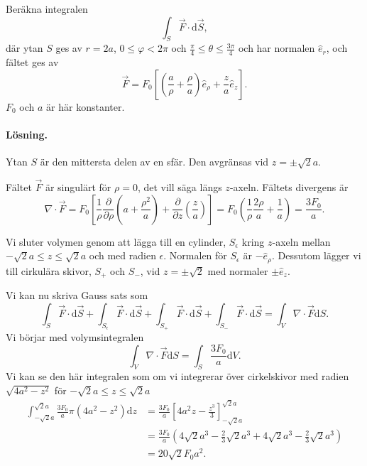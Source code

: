 \documentclass[%
oneside,                 %
final,                   %
10pt]{article}
\begin{document}
\vspace{3mm}


Beräkna integralen
\begin{equation}
  \int_S \vec{F} \cdot \mbox{d}\vec{S},
\end{equation}
där ytan $S$ ges av $r = 2a$, $0 \le \varphi < 2\pi$ och $\frac{\pi}{4} \le \theta \le \frac{3\pi}{4}$ och har normalen $\hat{e}_{r}$, och fältet ges av
\begin{equation}
  \vec{F} = F_0 \left[\left(\frac{a}{\rho} + \frac{\rho}{a}\right) 
\hat{e}_{\rho} + \frac{z}{a} \hat{e}_{z}\right].
\end{equation}
$F_0$ och $a$ är här konstanter.

\paragraph{Lösning.}
Ytan $S$ är den mittersta delen av en sfär. Den avgränsas vid $z = \pm \sqrt{2} a$.

Fältet $\vec{F}$ är singulärt för $\rho = 0$, det vill säga längs $z$-axeln.  Fältets divergens är
\begin{equation}
  \nabla \cdot \vec{F} = F_0 \left[\frac{1}{\rho} \frac{\partial}{\partial \rho}
\left(a+ \frac{\rho^2}{a}\right) + \frac{\partial}{\partial z} \left(\frac{z}{a}
\right)\right] = F_0 \left(\frac{1}{\rho}\frac{2\rho}{a} + \frac{1}{a}\right) =
\frac{3 F_0}{a}.
\end{equation}

Vi sluter volymen genom att lägga till en cylinder, $S_\epsilon$ kring $z$-axeln mellan $-\sqrt{2}a \le z \le \sqrt{2}a$ och med radien $\epsilon$.  Normalen för $S_\epsilon$ är $-\hat{e}_{\rho}$.  Dessutom lägger vi till cirkulära skivor, $S_+$ och $S_-$, vid $z = \pm \sqrt{2}$ med normaler $\pm \hat{e}_{z}$.

Vi kan nu skriva Gauss sats som
\begin{equation}
\int_S \vec{F} \cdot \mbox{d}\vec{S} + \int_{S_\epsilon} \vec{F} \cdot \mbox{d}\vec{S} +
\int_{S_+} \vec{F} \cdot \mbox{d}\vec{S} + \int_{S_-} \vec{F} \cdot \mbox{d}\vec{S} =
\int_V \nabla \cdot \vec{F} \mbox{d}S.
\end{equation}
Vi börjar med volymsintegralen
\begin{equation}
  \int_V \nabla \cdot \vec{F} \mbox{d}S = \int_S \frac{3 F_0}{a} \mbox{d}V.
\end{equation}
Vi kan se den här integralen som om vi integrerar över cirkelskivor med radien $\sqrt{4 a^2 -z^2}$ för $-\sqrt{2}a \le z \le \sqrt{2}a$
\begin{align}
  \int_{-\sqrt{2}a}^{\sqrt{2}a} \frac{3F_0}{a} \pi \left(4a^2 - z^2\right)
\mbox{d}z &= \frac{3F_0}{a} 
\left[4a^2z - \frac{z^3}{3}\right]_{-\sqrt{2}a}^{\sqrt{2}a}
\nonumber \\
&= \frac{3F_0}{a} \left(4\sqrt{2}a^3 - \frac{2}{3}\sqrt{2}a^3 +
4\sqrt{2}a^3 - \frac{2}{3}\sqrt{2}a^3\right) \nonumber \\
&= 20 \sqrt{2} F_0 a^2.
\end{align}
\end{document}

